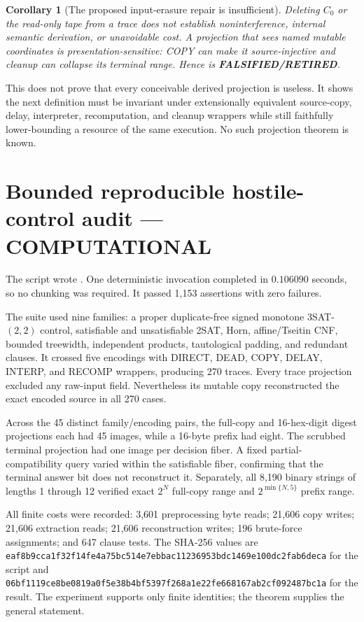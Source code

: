 \documentclass[11pt]{article}
\newtheorem{corollary}[theorem]{Corollary}
\newcommand{\COMP}{\textbf{COMPUTATIONAL}}
\newcommand{\RETIRED}{\textbf{FALSIFIED/RETIRED}}
\newcommand{\claim}[1]{\texttt{\detokenize{#1}}}
\begin{document}
\begin{corollary}[The proposed input-erasure repair is insufficient]
Deleting $C_0$ or the read-only tape from a trace does not establish
noninterference, internal semantic derivation, or unavoidable cost.  A
projection that sees named mutable coordinates is presentation-sensitive:
COPY can make it source-injective and cleanup can collapse its terminal
range.  Hence \claim{DERIVED-TRACE-RANGE-AS-HARDNESS1} is \RETIRED.
\end{corollary}

This does not prove that every conceivable derived projection is useless.
It shows the next definition must be invariant under extensionally equivalent
source-copy, delay, interpreter, recomputation, and cleanup wrappers while
still faithfully lower-bounding a resource of the same execution.  No such
projection theorem is known.

\section{Bounded reproducible hostile-control audit --- \COMP}
The script
 wrote
.
One deterministic invocation completed in $0.106090$ seconds, so no chunking
was required.  It passed 1,153 assertions with zero failures.

The suite used nine families: a proper duplicate-free signed monotone
$3$SAT-$(2,2)$ control, satisfiable and unsatisfiable 2SAT, Horn,
affine/Tseitin CNF, bounded treewidth, independent products, tautological
padding, and redundant clauses.  It crossed five encodings with DIRECT,
DEAD, COPY, DELAY, INTERP, and RECOMP wrappers, producing 270 traces.  Every
trace projection excluded any raw-input field.  Nevertheless its mutable
copy reconstructed the exact encoded source in all 270 cases.

Across the 45 distinct family/encoding pairs, the full-copy and 16-hex-digit
digest projections each had 45 images, while a 16-byte prefix had eight.
The scrubbed terminal projection had one image per decision fiber.  A fixed
partial-compatibility query varied within the satisfiable fiber, confirming
that the terminal answer bit does not reconstruct it.  Separately, all 8,190
binary strings of lengths 1 through 12 verified exact $2^N$ full-copy range
and $2^{\min\{N,5\}}$ prefix range.

All finite costs were recorded: 3,601 preprocessing byte reads; 21,606 copy
writes; 21,606 extraction reads; 21,606 reconstruction writes; 196 brute-force
assignments; and 647 clause tests.  The SHA-256 values are
\nolinkurl{eaf8b9cca1f32f14fe4a75bc514e7ebbac11236953bdc1469e100dc2fab6deca}
for the script and
\nolinkurl{06bf1119ce8be0819a0f5e38b4bf5397f268a1e22fe668167ab2cf092487bc1a}
for the result.  The experiment supports only finite identities; the theorem
supplies the general statement.
\end{document}
